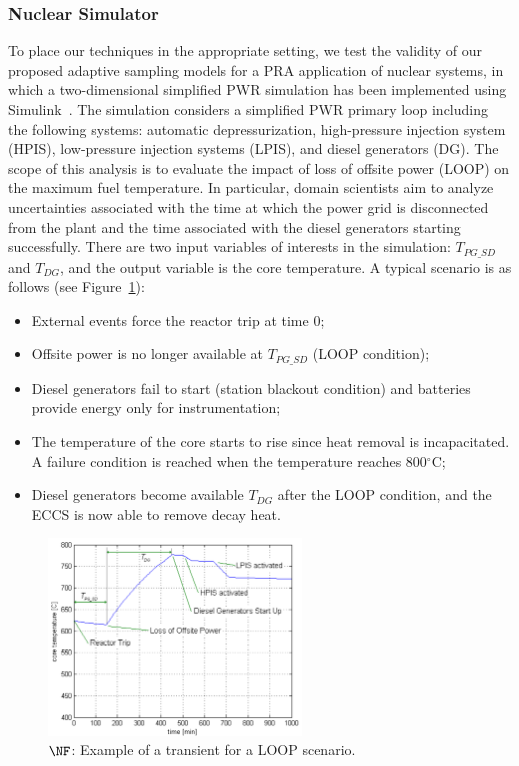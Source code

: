 
\subsubsection{Nuclear Simulator}

To place our techniques in the appropriate setting, we test the validity of our proposed adaptive sampling models for a PRA application of nuclear systems, in which a two-dimensional simplified PWR simulation has been implemented using Simulink~\cite{MandelliSmith2012}.
%
The simulation considers a simplified PWR primary loop including the following systems: automatic depressurization, high-pressure injection system (HPIS), low-pressure injection systems (LPIS), and diesel generators (DG).
%
The scope of this analysis is to evaluate the impact of loss of offsite power (LOOP) on the maximum fuel temperature.
%
In particular, domain scientists aim to analyze uncertainties associated with the time at which the power grid is disconnected from the plant and the time associated with the diesel generators starting successfully.
%
There are two input variables of interests in the simulation: $T_{PG\_SD}$ and $T_{DG}$, and the output variable is the core temperature.
%
A typical scenario is as follows (see Figure~\ref{fig:nuclearTransient}):
\begin{itemize} \denselist
  \item External events force the reactor trip at time $0$;
  \item Offsite power is no longer available at $T_{PG\_SD}$ (LOOP condition);
  \item Diesel generators fail to start (station blackout condition) and batteries provide energy only for instrumentation;
  \item The temperature of the core starts to rise since heat removal is incapacitated. A failure condition is reached when the temperature reaches 800$^{\circ}$C;
  \item Diesel generators become available $T_{DG}$ after the LOOP condition, and the ECCS is now able to remove decay heat.
\end{itemize}

\begin{figure}[!ht]
  \centering
  \includegraphics[width=0.6\textwidth]{figs/chap5/scenExample.pdf}
  \caption[Example of a transient for a LOOP scenario]{$\protect\NF$: Example of a transient for a LOOP scenario.}
  \label{fig:nuclearTransient}
\end{figure}

